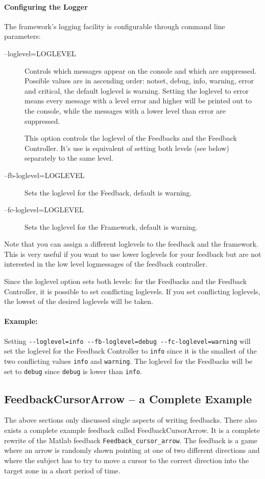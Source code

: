 \paragraph{Configuring the Logger} The framework's logging facility is configurable through command line parameters:
\begin{description}
\item[--loglevel=LOGLEVEL] Controls which messages appear on the console and which are suppressed. Possible values are in ascending order: notset, debug, info, warning, error and critical, the default loglevel is warning. Setting the loglevel to error means every message with a level error and higher will be printed out to the console, while the messages with a lower level than error are suppressed.

This option controls the loglevel of the Feedbacks and the Feedback Controller. It's use is equivalent of setting both levels (see below) separately to the same level.
\item[--fb-loglevel=LOGLEVEL] Sets the loglevel for the Feedback, default is warning.
\item[--fc-loglevel=LOGLEVEL] Sets the loglevel for the Framework, default is warning.
\end{description}
Note that you can assign a different loglevels to the feedback and the framework. This is very useful if you want to use lower loglevels for your feedback but are not interested in the low level logmessages of the feedback controller.

Since the loglevel option sets both levels: for the Feedbacks and the Feedback Controller, it is possible to set conflicting loglevels. If you set conflicting loglevels, the lowest of the desired loglevels will be taken. 

\paragraph{Example: } Setting \verb+--loglevel=info --fb-loglevel=debug --fc-loglevel=warning+ will set the loglevel for the Feedback Controller to \verb+info+ since it is the smallest of the two conflicting values \verb+info+ and \verb+warning+. The loglevel for the Feedbacks will be set to \verb+debug+ since \verb+debug+ is lower than \verb+info+.

\subsection{FeedbackCursorArrow -- a Complete Example}
The above sections only discussed single aspects of writing feedbacks. There also exists a complete example feedback called FeedbackCursorArrow. It is a complete rewrite of the Matlab feedback \lstinline+Feedback_cursor_arrow+. The feedback is a game where an arrow is randomly shown pointing at one of two different directions and where the subject has to try to move a cursor to the correct direction into the target zone in a short period of time.

